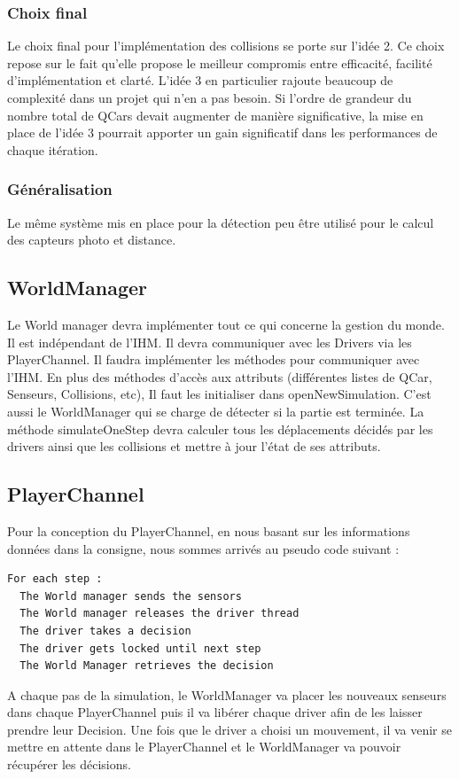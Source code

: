 \documentclass[a4paper, 12pt]{article}
\begin{document}
\subsubsection{Choix final}
Le choix final pour l'implémentation des collisions se porte sur l'idée 2. Ce choix repose sur le fait qu'elle propose le meilleur compromis entre efficacité, facilité d'implémentation et clarté. L'idée 3 en particulier rajoute beaucoup de complexité dans un projet qui n'en a pas besoin. Si l'ordre de grandeur du nombre total de QCars devait augmenter de manière significative, la mise en place de l'idée 3 pourrait apporter un gain significatif dans les performances de chaque itération.
\subsubsection{Généralisation}
Le même système mis en place pour la détection peu être utilisé pour le calcul des capteurs photo et distance.
\subsection{WorldManager}
Le World manager devra implémenter tout ce qui concerne la gestion du monde. Il est indépendant de l'IHM. Il devra communiquer avec les Drivers via les PlayerChannel. Il faudra implémenter les méthodes pour communiquer avec l'IHM. En plus des méthodes d'accès aux attributs (différentes listes de QCar, Senseurs, Collisions, etc), Il faut les initialiser dans openNewSimulation. C'est aussi le WorldManager qui se charge de détecter si la partie est terminée. La méthode simulateOneStep devra calculer tous les déplacements décidés par les drivers ainsi que les collisions et mettre à jour l'état de ses attributs.
\subsection{PlayerChannel}
Pour la conception du PlayerChannel, en nous basant sur les informations données dans la consigne, nous sommes arrivés au pseudo code suivant : 
\begin{lstlisting}
For each step :
  The World manager sends the sensors
  The World manager releases the driver thread
  The driver takes a decision
  The driver gets locked until next step
  The World Manager retrieves the decision
\end{lstlisting}
A chaque pas de la simulation, le WorldManager va placer les nouveaux senseurs dans chaque PlayerChannel puis il va libérer chaque driver afin de les laisser prendre leur Decision. Une fois que le driver a choisi un mouvement, il va venir se mettre en attente dans le PlayerChannel et le WorldManager va pouvoir récupérer les décisions.
\end{document}
